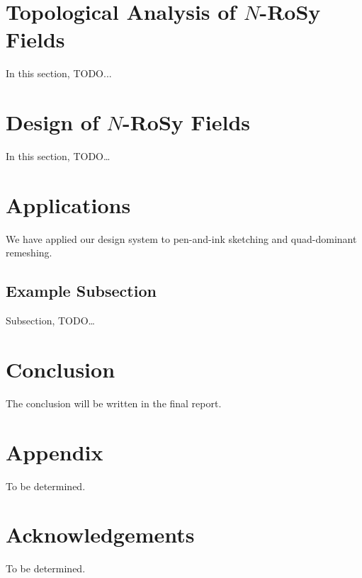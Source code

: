 \documentclass{acmsiggraph}               %
\begin{document}
\section{Topological Analysis of $N$-RoSy Fields}
\label{sec:analysis}

In this section, TODO...

\section{Design of $N$-RoSy Fields}
\label{sec:design}

In this section, TODO\dots



\section{Applications}
\label{sec:application}

We have applied our design system to pen-and-ink sketching and
quad-dominant remeshing.


\subsection{Example Subsection}
\label{sec:pen_and_ink}

Subsection, TODO\dots



\section{Conclusion}
\label{sec:conclusion}

The conclusion will be written in the final report.


\section*{Appendix}
\label{sec:higher_tensors}

To be determined.

\section*{Acknowledgements}

To be determined.



\nocite{*}

\end{document}
